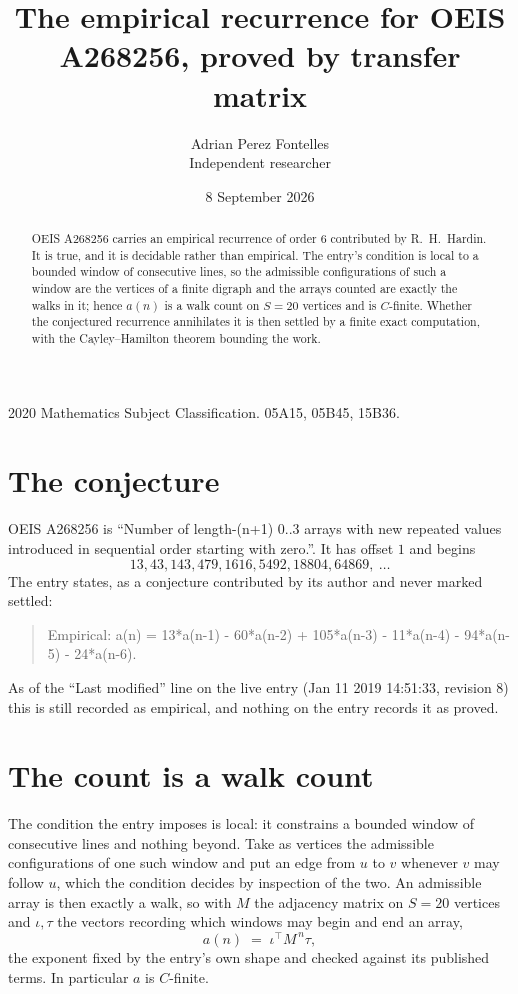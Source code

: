 \documentclass[11pt,a4paper]{article}
\title{The empirical recurrence for OEIS A268256, proved by transfer matrix}
\author{Adrian Perez Fontelles\\ \small Independent researcher}
\date{8 September 2026}
\theoremstyle{plain}
\theoremstyle{definition}
\begin{document}
\maketitle

\begin{abstract}
OEIS A268256 carries an empirical recurrence of order $6$ contributed by R.~H.~Hardin. It is
true, and it is decidable rather than empirical. The entry's condition is local to a bounded window of consecutive lines, so
the admissible configurations of such a window are the vertices of a finite digraph and the
arrays counted are exactly the walks in it; hence $a(n)$ is a walk count on $S=20$ vertices
and is $C$-finite. Whether the conjectured recurrence annihilates it is then settled by a
finite exact computation, with the Cayley--Hamilton theorem bounding the work.
\end{abstract}

\noindent\small 2020 Mathematics Subject Classification. 05A15, 05B45, 15B36.\normalsize

\section{The conjecture}

OEIS A268256 is ``Number of length-(n+1) 0..3 arrays with new repeated values introduced in sequential order starting with zero.''. It has offset $1$ and begins
\[
13, 43, 143, 479, 1616, 5492, 18804, 64869,\ \dots
\]
The entry states, as a conjecture contributed by its author and never marked settled:
\begin{quote}
Empirical: a(n) = 13*a(n-1) - 60*a(n-2) + 105*a(n-3) - 11*a(n-4) - 94*a(n-5) - 24*a(n-6).
\end{quote}
As of the ``Last modified'' line on the live entry (Jan 11 2019 14:51:33, revision 8) this is still
recorded as empirical, and nothing on the entry records it as proved.

\section{The count is a walk count}

The condition the entry imposes is local: it constrains a bounded window of consecutive lines and nothing beyond. Take as
vertices the admissible configurations of one such window and put an edge from $u$ to $v$
whenever $v$ may follow $u$, which the condition decides by inspection of the two. An
admissible array is then exactly a walk, so with $M$ the adjacency matrix on $S=20$ vertices
and $\iota,\tau$ the vectors recording which windows may begin and end an array,
\[
a(n)\;=\;\iota^{\!\top}M^{\,n}\tau ,
\]
the exponent fixed by the entry's own shape and checked against its published terms. In
particular $a$ is $C$-finite.
\end{document}
